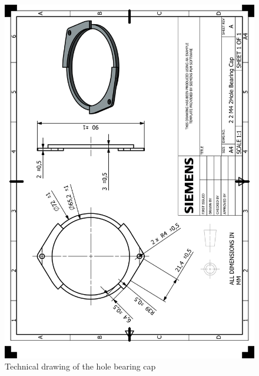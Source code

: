 \documentclass[12pt]{report}
\begin{document}
\begin{appendices}
\begin{figure}[H]
    \centering
    \includegraphics[width=\textwidth]{HP_2 2 M4 2Hole Bearing Cap.png} 
    \caption{Technical drawing of the hole bearing cap}
    \label{fig:technical-drawing}
\end{figure}


\end{appendices}
\end{document}
